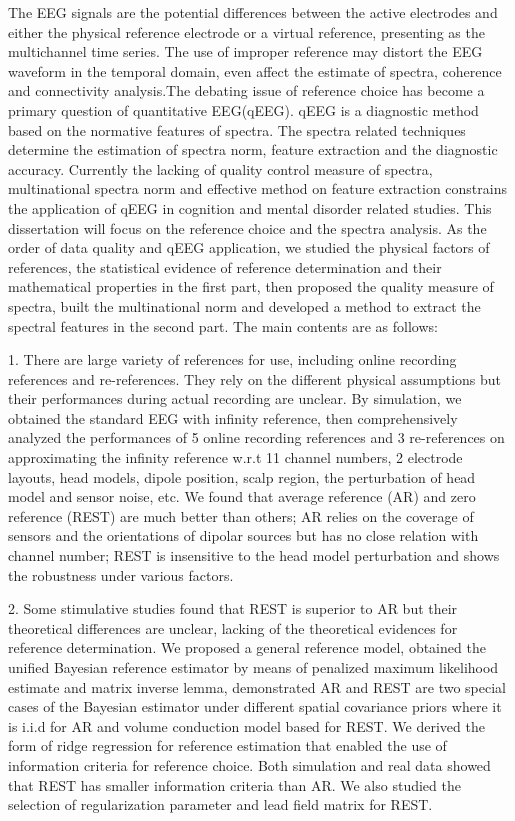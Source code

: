 
\begin{englishabstract}
The EEG signals are the potential differences between the active electrodes and either the physical reference electrode or a virtual reference, presenting as the multichannel time series. The use of improper reference may distort the EEG waveform in the temporal domain, even affect the estimate of spectra, coherence and connectivity analysis.The debating issue of reference choice has become a primary question of quantitative EEG(qEEG). qEEG is a diagnostic method based on the normative features of spectra. The spectra related techniques determine the estimation of spectra norm, feature extraction and the diagnostic accuracy. Currently the lacking of quality control measure of spectra, multinational spectra norm and effective method on feature extraction constrains the application of qEEG in cognition and mental disorder related studies. This dissertation will focus on the reference choice and the spectra analysis. As the order of data quality and qEEG application, we studied the physical factors of references, the statistical evidence of reference determination and their mathematical properties in the first part, then proposed the quality measure of spectra, built the multinational norm and developed a method to extract the spectral features in the second part. The main contents are as follows:

1. There are large variety of references for use, including online recording references and re-references. They rely on the different physical assumptions but their performances during actual recording are unclear. By simulation, we obtained the standard EEG with infinity reference, then comprehensively analyzed the performances of 5 online recording references and 3 re-references on approximating the infinity reference w.r.t 11 channel numbers, 2 electrode layouts, head models, dipole position, scalp region, the perturbation of head model and sensor noise, etc. We found that average reference (AR) and zero reference (REST) are much better than others; AR relies on the coverage of sensors and the orientations of dipolar sources but has no close relation with channel number; REST is insensitive to the head model perturbation and shows the robustness under various factors. 

2. Some stimulative studies found that REST is superior to AR but their theoretical differences are unclear, lacking of the theoretical evidences for reference determination. We proposed a general reference model, obtained the unified Bayesian reference estimator by means of penalized maximum likelihood estimate and matrix inverse lemma, demonstrated AR and REST are two special cases of the Bayesian estimator under different spatial covariance priors where it is i.i.d for AR and volume conduction model based for REST. We derived the form of ridge regression for reference estimation that enabled the use of information criteria for reference choice. Both simulation and real data showed that REST has smaller information criteria than AR. We also studied the selection of regularization parameter and lead field matrix for REST. 


\end{englishabstract}
